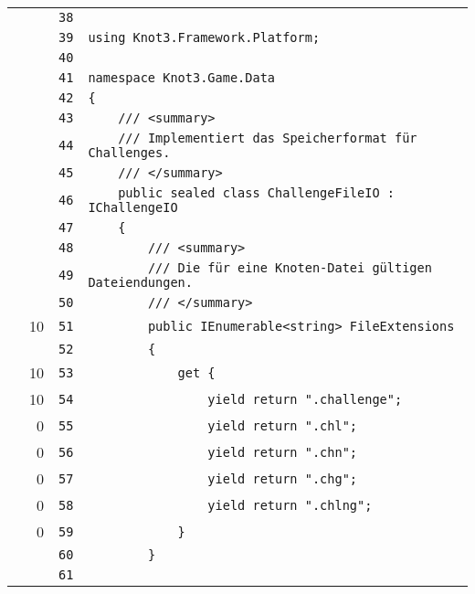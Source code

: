 \documentclass[a4paper,10pt]{article}
\begin{document}
\begin{longtable}[l]{lrrl}
\cellcolor{gray} &  & \verb~38~ & \verb~~\\
\cellcolor{gray} &  & \verb~39~ & \verb~using Knot3.Framework.Platform;~\\
\cellcolor{gray} &  & \verb~40~ & \verb~~\\
\cellcolor{gray} &  & \verb~41~ & \verb~namespace Knot3.Game.Data~\\
\cellcolor{gray} &  & \verb~42~ & \verb~{~\\
\cellcolor{gray} &  & \verb~43~ & \verb~    /// <summary>~\\
\cellcolor{gray} &  & \verb~44~ & \verb~    /// Implementiert das Speicherformat für Challenges.~\\
\cellcolor{gray} &  & \verb~45~ & \verb~    /// </summary>~\\
\cellcolor{gray} &  & \verb~46~ & \verb~    public sealed class ChallengeFileIO : IChallengeIO~\\
\cellcolor{gray} &  & \verb~47~ & \verb~    {~\\
\cellcolor{gray} &  & \verb~48~ & \verb~        /// <summary>~\\
\cellcolor{gray} &  & \verb~49~ & \verb~        /// Die für eine Knoten-Datei gültigen Dateiendungen.~\\
\cellcolor{gray} &  & \verb~50~ & \verb~        /// </summary>~\\
\cellcolor{green} & 10 & \verb~51~ & \verb~        public IEnumerable<string> FileExtensions~\\
\cellcolor{gray} &  & \verb~52~ & \verb~        {~\\
\cellcolor{green} & 10 & \verb~53~ & \verb~            get {~\\
\cellcolor{green} & 10 & \verb~54~ & \verb~                yield return ".challenge";~\\
\cellcolor{red} & 0 & \verb~55~ & \verb~                yield return ".chl";~\\
\cellcolor{red} & 0 & \verb~56~ & \verb~                yield return ".chn";~\\
\cellcolor{red} & 0 & \verb~57~ & \verb~                yield return ".chg";~\\
\cellcolor{red} & 0 & \verb~58~ & \verb~                yield return ".chlng";~\\
\cellcolor{red} & 0 & \verb~59~ & \verb~            }~\\
\cellcolor{gray} &  & \verb~60~ & \verb~        }~\\
\cellcolor{gray} &  & \verb~61~ & \verb~~\\

\end{longtable}
\end{document}

